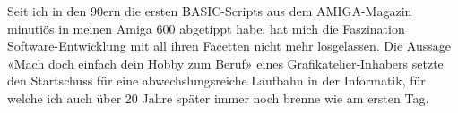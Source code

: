 \documentclass[10pt]{developercv} %
\begin{document}
\vspace{0.5cm} %



\begin{minipage}[t]{0.4\textwidth} %
	\vspace{-\baselineskip} %
	Seit ich in den 90ern die ersten BASIC-Scripts aus dem AMIGA-Magazin minutiös in meinen Amiga 600 abgetippt habe, hat mich die Faszination Software-Entwicklung mit all ihren Facetten nicht mehr losgelassen. Die Aussage «Mach doch einfach dein Hobby zum Beruf» eines Grafikatelier-Inhabers setzte den Startschuss für eine abwechslungsreiche Laufbahn in der Informatik, für welche ich auch über 20 Jahre später immer noch brenne wie am ersten Tag.\\
\end{minipage}
\hfill %
\vspace{0.25cm} %
\begin{minipage}[t]{0.5\textwidth} %
	\vspace{-\baselineskip} %

	\begin{barchart}{5.5} %
	\end{barchart}
\end{minipage}

\begin{center}
\end{center}

\end{document}
